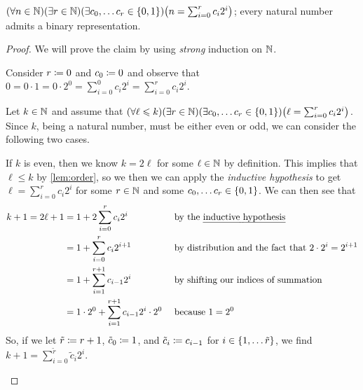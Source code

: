 \begin{example}
    $\pn*{\forall n \in \N}\pn*{\exists r \in \N}\pn*{\exists c_0, \dots c_r \in \set*{0, 1}}\pn*{n = \sum_{i = 0}^{r}c_i 2^i}$;
    \ie every natural number admits a binary representation.
\end{example}
\begin{proof}
    We will prove the claim by using \emph{strong} induction on $\mathbb{N}$.
    \begin{case}
        Consider $r \coloneqq 0$ and $c_0 \coloneqq 0$ and observe that
        $0 = 0 \cdot 1 = 0 \cdot 2^{0} = \sum_{i = 0}^{0}c_i 2^i = \sum_{i = 0}^{r}c_i 2^i$.
    \end{case}
    \begin{case}
        Let $k \in \mathbb{N}$ and assume that
        $\pn*{\forall \ell \leq k}\pn*{\exists r \in \N}\pn*{\exists c_0, \dots c_r \in \set*{0, 1}}
        \pn*{\ell = \sum_{i = 0}^{r}c_i 2^i}$.
        Since $k$, being a natural number, must be either even or odd, we can consider the following two cases.
        \begin{case}[Case 1]
            If $k$ is even, then we know $k = 2 \ell$ for some $\ell \in \mathbb{N}$ by definition.
            This implies that $\ell \leq k$ by \autoref{lem:order},
            so we then we can apply the \emph{inductive hypothesis} to get $\ell = \sum_{i = 0}^{r}c_i 2^i$
            for some $r \in \mathbb{N}$ and some $c_0, \dots c_r \in \set*{0, 1}$.
            We can then see that
            \begin{alignat*}{2}
                k + 1 = 2\ell + 1
                      &= 1 + 2 \sum_{i = 0}^{r}c_i 2^i &&\text{ by the \emph{inductive hypothesis}}\\
                      &= 1 + \sum_{i = 0}^{r}c_i 2^{i + 1} &&\text{ by distribution and the fact that } 2 \cdot 2^i = 2^{i + 1}\\
                      &= 1 + \sum_{i = 1}^{r + 1}c_{i - 1} 2^i &&\text{ by shifting our indices of summation}\\
                      &= 1 \cdot 2^0 + \sum_{i = 1}^{r + 1}c_{i - 1} 2^i \cdot 2^0 &&\text{ because } 1 = 2^0
            \end{alignat*}
            So, if we let $\tilde{r} \coloneqq r + 1$, $\tilde{c}_0 \coloneqq 1$,
            and $\tilde{c}_i \coloneqq c_{i - 1}$ for $i \in \set*{1, \dots \tilde{r}}$,
            we find $k + 1 = \sum_{i = 0}^{\tilde{r}}\tilde{c}_i 2^i$.
        \end{case}
        \begin{case}[Case 2]

\end{case}
\end{case}
\end{proof}
